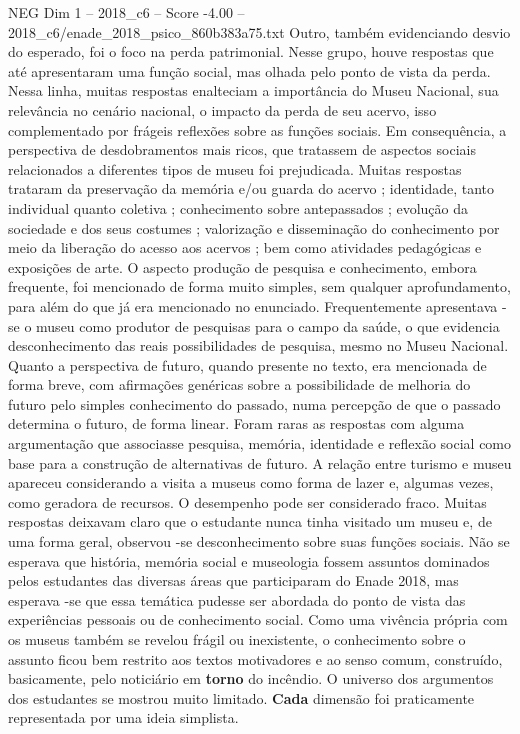 \begin{textsample}{NEG Dim 1 – 2018\_c6 – Score -4.00 – 2018\_c6/enade\_2018\_psico\_860b383a75.txt}
Outro, também evidenciando desvio do esperado, foi o foco na perda patrimonial.
Nesse grupo, houve respostas que até apresentaram uma função social, mas olhada pelo ponto de vista da perda.
Nessa linha, muitas respostas enalteciam a importância do Museu Nacional, sua relevância no cenário nacional, o impacto da perda de seu acervo, isso complementado por frágeis reflexões sobre as funções sociais.
Em consequência, a perspectiva de desdobramentos mais ricos, que tratassem de aspectos sociais relacionados a diferentes tipos de museu foi prejudicada.
Muitas respostas trataram da preservação da memória e/ou guarda do acervo ; identidade, tanto individual quanto coletiva ; conhecimento sobre antepassados ; evolução da sociedade e dos seus costumes ; valorização e disseminação do conhecimento por meio da liberação do acesso aos acervos ; bem como atividades pedagógicas e exposições de arte.
O aspecto produção de pesquisa e conhecimento, embora frequente, foi mencionado de forma muito simples, sem qualquer aprofundamento, para além do que já era mencionado no enunciado.
Frequentemente apresentava -se o museu como produtor de pesquisas para o campo da saúde, o que evidencia desconhecimento das reais possibilidades de pesquisa, mesmo no Museu Nacional.
Quanto a perspectiva de futuro, quando presente no texto, era mencionada de forma breve, com afirmações genéricas sobre a possibilidade de melhoria do futuro pelo simples conhecimento do passado, numa percepção de que o passado determina o futuro, de forma linear.
Foram raras as respostas com alguma argumentação que associasse pesquisa, memória, identidade e reflexão social como base para a construção de alternativas de futuro.
A relação entre turismo e museu apareceu considerando a visita a museus como forma de lazer e, algumas vezes, como geradora de recursos.
O desempenho pode ser considerado fraco.
Muitas respostas deixavam claro que o estudante nunca tinha visitado um museu e, de uma forma geral, observou -se desconhecimento sobre suas funções sociais.
Não se esperava que história, memória social e museologia fossem assuntos dominados pelos estudantes das diversas áreas que participaram do Enade 2018, mas esperava -se que essa temática pudesse ser abordada do ponto de vista das experiências pessoais ou de conhecimento social.
Como uma vivência própria com os museus também se revelou frágil ou inexistente, o conhecimento sobre o assunto ficou bem restrito aos textos motivadores e ao senso comum, construído, basicamente, pelo noticiário em \textbf{torno} do incêndio.
O universo dos argumentos dos estudantes se mostrou muito limitado. \textbf{Cada} dimensão foi praticamente representada por uma ideia simplista.

\end{textsample}
